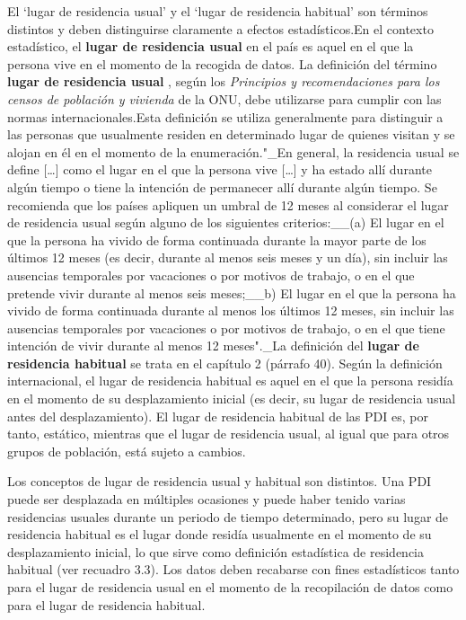 \documentclass[
]{book}
\begin{document}
\begin{enumerate}
  El `lugar de residencia usual' y el `lugar de residencia habitual' son términos distintos y deben distinguirse claramente a efectos estadísticos.En el contexto estadístico, el \textbf{lugar de residencia usual} en el país es aquel en el que la persona vive en el momento de la recogida de datos. La definición del término \textbf{lugar de residencia usual} , según los \emph{Principios y recomendaciones para los censos de población y vivienda} de la ONU, debe utilizarse para cumplir con las normas internacionales.Esta definición se utiliza generalmente para distinguir a las personas que usualmente residen en determinado lugar de quienes visitan y se alojan en él en el momento de la enumeración."\_En general, la residencia usual se define {[}\ldots{]} como el lugar en el que la persona vive {[}\ldots{]} y ha estado allí durante algún tiempo o tiene la intención de permanecer allí durante algún tiempo. Se recomienda que los países apliquen un umbral de 12 meses al considerar el lugar de residencia usual según alguno de los siguientes criterios:\_\_(a) El lugar en el que la persona ha vivido de forma continuada durante la mayor parte de los últimos 12 meses (es decir, durante al menos seis meses y un día), sin incluir las ausencias temporales por vacaciones o por motivos de trabajo, o en el que pretende vivir durante al menos seis meses;\_\_b) El lugar en el que la persona ha vivido de forma continuada durante al menos los últimos 12 meses, sin incluir las ausencias temporales por vacaciones o por motivos de trabajo, o en el que tiene intención de vivir durante al menos 12 meses".\_La definición del \textbf{lugar de residencia habitual} se trata en el capítulo 2 (párrafo 40). Según la definición internacional, el lugar de residencia habitual es aquel en el que la persona residía en el momento de su desplazamiento inicial (es decir, su lugar de residencia usual antes del desplazamiento). El lugar de residencia habitual de las PDI es, por tanto, estático, mientras que el lugar de residencia usual, al igual que para otros grupos de población, está sujeto a cambios.
\end{enumerate}

Los conceptos de lugar de residencia usual y habitual son distintos. Una PDI puede ser desplazada en múltiples ocasiones y puede haber tenido varias residencias usuales durante un periodo de tiempo determinado, pero su lugar de residencia habitual es el lugar donde residía usualmente en el momento de su desplazamiento inicial, lo que sirve como definición estadística de residencia habitual (ver recuadro 3.3). Los datos deben recabarse con fines estadísticos tanto para el lugar de residencia usual en el momento de la recopilación de datos como para el lugar de residencia habitual.
\end{document}
